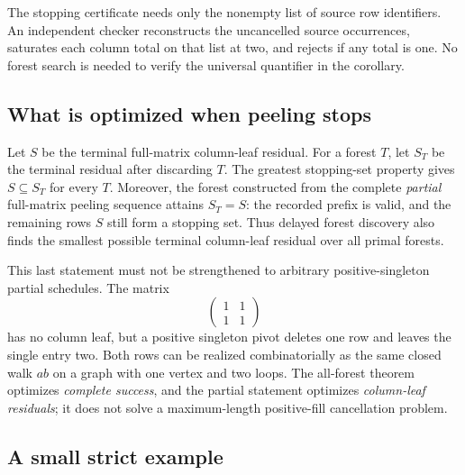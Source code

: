 The stopping certificate needs only the nonempty list of source row
identifiers.  An independent checker reconstructs the uncancelled source
occurrences, saturates each column total on that list at two, and rejects
if any total is one.  No forest search is needed to verify the universal
quantifier in the corollary.

\subsection{What is optimized when peeling stops}

Let $S$ be the terminal full-matrix column-leaf residual.  For a forest
$T$, let $S_T$ be the terminal residual after discarding $T$.  The greatest
stopping-set property gives $S\subseteq S_T$ for every $T$.  Moreover, the
forest constructed from the complete \emph{partial} full-matrix peeling
sequence attains $S_T=S$: the recorded prefix is valid, and the remaining
rows $S$ still form a stopping set.  Thus delayed forest discovery also
finds the smallest possible terminal column-leaf residual over all primal
forests.

This last statement must not be strengthened to arbitrary
positive-singleton partial schedules.  The matrix
\[
 \begin{pmatrix}1&1\\1&1\end{pmatrix}
\]
has no column leaf, but a positive singleton pivot deletes one row and
leaves the single entry two.  Both rows can be realized combinatorially as
the same closed walk $ab$ on a graph with one vertex and two loops.  The
all-forest theorem optimizes \emph{complete success}, and the partial
statement optimizes \emph{column-leaf residuals}; it does not solve a
maximum-length positive-fill cancellation problem.

\subsection{A small strict example}


